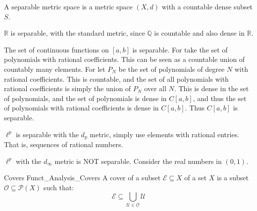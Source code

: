         \begin{definition}
            A separable metric space
            is a metric space $(X,d)$ with
            a countable dense subset $S$.
        \end{definition}
        \begin{example}
            $\mathbb{R}$ is separable, with
            the standard metric, since
            $\mathbb{Q}$ is countable and also
            dense in $\mathbb{R}$.
        \end{example}
        \begin{example}
            The set of continuous functions on
            $[a,b]$ is separable. For
            take the set of polynomials with
            rational coefficients. This can
            be seen as a countable union of
            countably many elements. For let
            $P_{N}$ be the set of polynomials
            of degree $N$ with rational
            coefficients. This is countable,
            and the set of all polynomials with
            rational coefficients is simply the
            union of $P_{N}$ over all $N$. This
            is dense in the set of polynomials,
            and the set of polynomials is dense
            in $C[a,b]$, and thus
            the set of polynomials with rational
            coefficients is dense in $C[a,b]$. Thus
            $C[a,b]$ is separable.
        \end{example}
        \begin{example}
            $\ell^{p}$ is separable with the
            $d_{p}$ metric, simply use elements
            with rational entries. That is,
            sequences of rational numbers.
        \end{example}
        \begin{example}
            $\ell^{p}$ with the $d_{\infty}$ metric
            is NOT separable. Consider the real
            numbers in $(0,1)$.
        \end{example}
        \begin{ldefinition}{Covers}
              {Funct_Analysis_Covers}
            A cover of a subset $\mathcal{E}\subseteq{X}$ of
            a set $X$ is a subset
            $\mathcal{O}\subseteq\mathcal{P}(X)$ such that:
            \begin{equation}
                \mathcal{E}\subseteq
                \bigcup_{\mathcal{U}\in\mathcal{O}}
                    \mathcal{U}
            \end{equation}
        \end{ldefinition}
